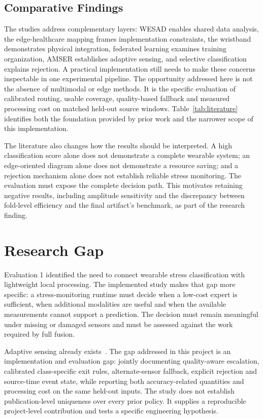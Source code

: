 \documentclass[conference,a4paper]{IEEEtran}
\begin{document}
\subsection{Comparative Findings}
The studies address complementary layers: WESAD enables shared data analysis, the edge-healthcare mapping frames implementation constraints, the wristband demonstrates physical integration, federated learning examines training organization, AMSER establishes adaptive sensing, and selective classification explains rejection. A practical implementation still needs to make these concerns inspectable in one experimental pipeline. The opportunity addressed here is not the absence of multimodal or edge methods. It is the specific evaluation of calibrated routing, usable coverage, quality-based fallback and measured processing cost on matched held-out source windows. Table~\ref{tab:literature} identifies both the foundation provided by prior work and the narrower scope of this implementation.

The literature also changes how the results should be interpreted. A high classification score alone does not demonstrate a complete wearable system; an edge-oriented diagram alone does not demonstrate a resource saving; and a rejection mechanism alone does not establish reliable stress monitoring. The evaluation must expose the complete decision path. This motivates retaining negative results, including amplitude sensitivity and the discrepancy between fold-level efficiency and the final artifact's benchmark, as part of the research finding.

\section{Research Gap}
Evaluation 1 identified the need to connect wearable stress classification with lightweight local processing. The implemented study makes that gap more specific: a stress-monitoring runtime must decide when a low-cost expert is sufficient, when additional modalities are useful and when the available measurements cannot support a prediction. The decision must remain meaningful under missing or damaged sensors and must be assessed against the work required by full fusion.

Adaptive sensing already exists~\cite{amser2022}. The gap addressed in this project is an implementation and evaluation gap: jointly documenting quality-aware escalation, calibrated class-specific exit rules, alternate-sensor fallback, explicit rejection and source-time event state, while reporting both accuracy-related quantities and processing cost on the same held-out inputs. The study does not establish publication-level uniqueness over every prior policy. It supplies a reproducible project-level contribution and tests a specific engineering hypothesis.
\end{document}
